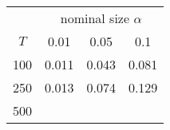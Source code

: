 % 
\begin{tabular}{cccc}
  \hline
  & \multicolumn{3}{c}{nominal size $\alpha$} \\
 $T$ & 0.01 & 0.05 & 0.1 \\
 \hline
100 & 0.011 & 0.043 & 0.081 \\ 
  250 & 0.013 & 0.074 & 0.129 \\ 
  500 &  &  &  \\ 
   \hline
\end{tabular}
